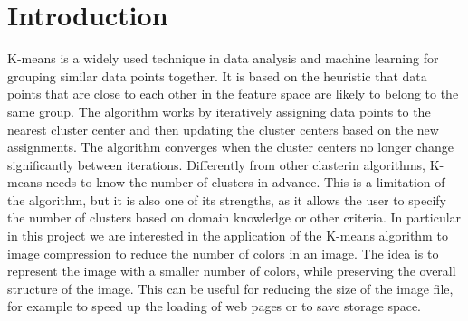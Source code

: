 \documentclass[12pt,oneside,a4paper]{article}
\begin{document}
\section{Introduction} \label{sec:intro}
K-means is a widely used technique in data analysis and machine learning for grouping similar data points together. It is based on the heuristic that data points that are close to each other in the feature space are likely to belong to the same group. The algorithm works by 
iteratively assigning data points to the nearest cluster center and then updating the cluster centers based on the new assignments. The algorithm converges when the cluster centers no longer change significantly between iterations.
Differently from other clasterin algorithms, K-means needs to know the number of clusters in advance. This is a limitation of the algorithm, but it is also one of its strengths, as it allows the user to specify the number of clusters based on domain knowledge or other criteria.
In particular in this project we are interested in the application of the K-means algorithm to image compression to reduce the number of colors in an image. The idea is to represent the image with a smaller number of colors, while preserving the overall structure of the image. 
This can be useful for reducing the size of the image file, for example to speed up the loading of web pages or to save storage space.
\end{document}
